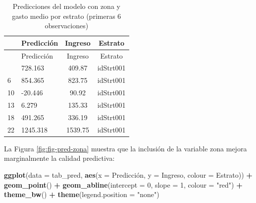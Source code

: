 \documentclass[
  spanish,
  12pt,
]{book}
\newenvironment{Shaded}{\begin{snugshade}}{\end{snugshade}}
\newcommand{\AttributeTok}[1]{\textcolor[rgb]{0.13,0.29,0.53}{#1}}
\newcommand{\DataTypeTok}[1]{\textcolor[rgb]{0.13,0.29,0.53}{#1}}
\newcommand{\DecValTok}[1]{\textcolor[rgb]{0.00,0.00,0.81}{#1}}
\newcommand{\FunctionTok}[1]{\textcolor[rgb]{0.13,0.29,0.53}{\textbf{#1}}}
\newcommand{\NormalTok}[1]{#1}
\newcommand{\OtherTok}[1]{\textcolor[rgb]{0.56,0.35,0.01}{#1}}
\newcommand{\SpecialCharTok}[1]{\textcolor[rgb]{0.81,0.36,0.00}{\textbf{#1}}}
\newcommand{\StringTok}[1]{\textcolor[rgb]{0.31,0.60,0.02}{#1}}
\newcounter{none} %
\begin{document}
\begin{Shaded}
\end{Shaded}

\begin{longtable}[]{@{}llcc@{}}
\caption{\label{tab:tab-pred-zona}Predicciones del modelo con zona y gasto medio por estrato (primeras 6 observaciones)}\tabularnewline
\toprule\noalign{}
& Predicción & Ingreso & Estrato \\
\midrule\noalign{}
\endfirsthead
\toprule\noalign{}
& Predicción & Ingreso & Estrato \\
\midrule\noalign{}
\endhead
\bottomrule\noalign{}
\endlastfoot
1 & 728.163 & 409.87 & idStrt001 \\
6 & 854.365 & 823.75 & idStrt001 \\
10 & -20.446 & 90.92 & idStrt001 \\
13 & 6.279 & 135.33 & idStrt001 \\
18 & 491.265 & 336.19 & idStrt001 \\
22 & 1245.318 & 1539.75 & idStrt001 \\
\end{longtable}

La Figura \ref{fig:fig-pred-zona} muestra que la inclusión de la variable zona mejora marginalmente la calidad predictiva:

\begin{Shaded}
\begin{Highlighting}[]
\FunctionTok{ggplot}\NormalTok{(}\AttributeTok{data =}\NormalTok{ tab\_pred,}
       \FunctionTok{aes}\NormalTok{(}\AttributeTok{x =}\NormalTok{ Predicción, }\AttributeTok{y =}\NormalTok{ Ingreso, }\AttributeTok{colour =}\NormalTok{ Estrato)) }\SpecialCharTok{+}
  \FunctionTok{geom\_point}\NormalTok{() }\SpecialCharTok{+}
  \FunctionTok{geom\_abline}\NormalTok{(}\AttributeTok{intercept =} \DecValTok{0}\NormalTok{, }\AttributeTok{slope =} \DecValTok{1}\NormalTok{, }\AttributeTok{colour =} \StringTok{"red"}\NormalTok{) }\SpecialCharTok{+}
  \FunctionTok{theme\_bw}\NormalTok{() }\SpecialCharTok{+}
  \FunctionTok{theme}\NormalTok{(}\AttributeTok{legend.position =} \StringTok{"none"}\NormalTok{)}
\end{Highlighting}
\end{Shaded}
\end{document}
